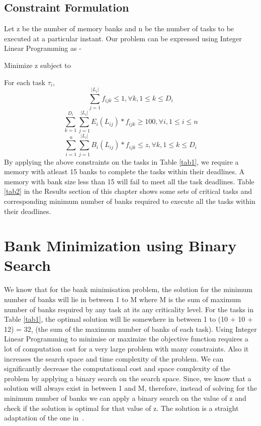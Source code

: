 \subsection{Constraint Formulation}\label{cfp}
\noindent
Let z be the number of memory banks and n be the number of tasks to be executed at a particular instant. Our problem can be 
expressed using Integer Linear Programming as - 
\newline
\begin{center}
 Minimize z subject to
 \end{center}
 For each task $\tau_i$,
\begin{equation}
\sum_{j = 1}^{|L_{i}|} f_{ijk} \leq 1, \forall k, 1 \leq k \leq D_{i}
\end{equation}
\newline
\begin{equation}
\sum_{k = 1}^{D_{i}} \sum_{j = 1}^{|L_{i}|} E_{i}(L_{ij}) * f_{ijk} \geq 100, \forall i, 1 \leq i \leq n
\end{equation}
\newline
\begin{equation}
\sum_{i = 1}^{n} \sum_{j = 1}^{|L_{i}|} B_{i}(L_{ij}) * f_{ijk} \leq z, \forall k, 1 \leq k \leq D_i
\end{equation}
\newline
By applying the above constraints on the tasks in Table \ref{tab1}, we require a memory with atleast 15 banks to complete the 
tasks within their deadlines. A memory with bank size less than 15 will fail to meet all the task deadlines. 
Table \ref{tab2} in the Results section of this chapter shows some sets of critical tasks and corresponding minimum number of 
banks required to execute all the tasks within their deadlines.


\section{Bank Minimization using Binary Search}\label{RMBS}
\noindent
We know that for the bank minimisation problem, the solution for the minimum number of banks will lie in between 1 to M where
M is the sum of maximum number of banks required by any task at its any criticality level. For the tasks in Table \ref{tab1},
the optimal solution will lie somewhere in between 1 to (10 + 10 + 12) = 32, (the sum of the maximum number of banks of each
task). Using Integer Linear Programming to minimise or 
maximize the objective function requires a lot of computation cost for a very large problem with many constraints. Also it 
increases the search space and time complexity of the problem. We can significantly decrease the computational cost and space 
complexity of the problem by applying a binary search on the search space. Since, we know that a solution will always 
exist in between 1 and M, therefore, instead of solving for the minimum number of banks we can apply a binary search on the value 
of z and check if the solution is optimal for that value of z. The solution is a straight adaptation of the one in~\cite{DBLP:conf/vlsid/RayDC07}. 


